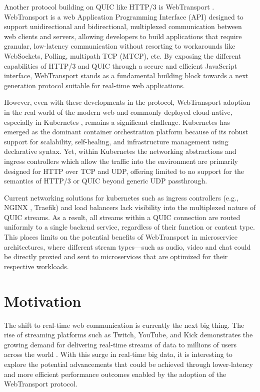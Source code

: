 Another protocol building on QUIC like HTTP/3 is WebTransport \cite{webtransport-draft}. WebTransport is a web Application Programming Interface (API) designed to support unidirectional and bidirectional, multiplexed communication between web clients and servers, allowing developers to build applications that require granular, low-latency communication without resorting to workarounds like WebSockets, Polling, multipath TCP (MTCP), etc. By exposing the different capabilities of HTTP/3 and QUIC through a secure and efficient JavaScript interface, WebTransport stands as a fundamental building block towards a next generation protocol suitable for real-time web applications.

However, even with these developments in the protocol, WebTransport adoption in the real world of the modern web and commonly deployed cloud-native, especially in Kubernetes \cite{kubernetes-docs}, remains a significant challenge. Kubernetes has emerged as the dominant container orchestration platform because of its robust support for scalability, self-healing, and infrastructure management using declarative syntax. Yet, within Kubernetes the networking abstractions and ingress controllers which allow the traffic into the environment are primarily designed for HTTP over TCP and UDP, offering limited to no support for the semantics of HTTP/3 or QUIC beyond generic UDP passthrough.

Current networking solutions for kubernetes such as ingress controllers (e.g., NGINX \cite{nginx-ingress-docs}, Traefik) and load balancers lack visibility into the multiplexed nature of QUIC streams. As a result, all streams within a QUIC connection are routed uniformly to a single backend service, regardless of their function or content type. This places limits on the potential benefits of WebTransport in microservice architectures, where different stream types—such as audio, video and chat could be directly proxied and sent to microservices that are optimized for their respective workloads.




\section{Motivation}

The shift to real-time web communication is currently the next big thing. The rise of streaming platforms such as Twitch, YouTube, and Kick demonstrates the growing demand for delivering real-time streams of data to millions of users across the world \cite{kreps2011}. With this surge in real-time big data, it is interesting to explore the potential advancements that could be achieved through lower-latency and more efficient performance outcomes enabled by the adoption of the WebTransport protocol.

